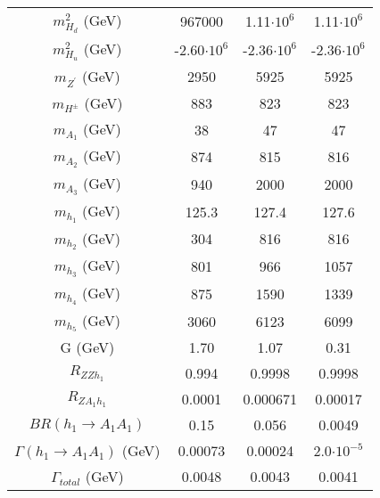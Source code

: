 \documentclass[12pt,a4paper]{article}
\begin{document}
\begin{table}
\begin{tabular}{| c || c | c | c |}
$m_{H_d}^2$ (GeV)                  &    967000            & 	1.11$\cdot 10^6$             & 	1.11$\cdot 10^6$                               \\
$m_{H_u}^2$ (GeV)                  &   -2.60$\cdot 10^6$         & 	-2.36$\cdot 10^6$            & 	-2.36$\cdot 10^6$                              \\
$m_{Z^\prime}$ (GeV)                 &    2950              & 	5925                    & 	5925                                      \\
$m_{H^\pm}$ (GeV)                   &    883               & 	823                    & 	823                                      \\
$m_{A_1}$ (GeV)                    &	38                & 	47                    & 	47                                    \\
$m_{A_2}$ (GeV)                    &	874               & 	815                   & 	816                                   \\
$m_{A_3}$ (GeV)                    &	940               & 	2000                   & 	2000                                  \\
$m_{h_1}$ (GeV)                    &	125.3             & 	127.4                 & 	127.6                                  \\
$m_{h_2}$ (GeV)                    &	304               & 	816                   & 	816                                    \\
$m_{h_3}$ (GeV)                    &	801               & 	966                   & 	1057                                   \\
$m_{h_4}$ (GeV)                    &	875               & 	1590                  & 	1339                                   \\
$m_{h_5}$ (GeV)                    &	3060              & 	6123                  & 	6099                                   \\
G (GeV)                          & 	1.70             & 	1.07                  & 	0.31                                   \\
$R_{ZZh_1}$                        &     0.994             & 	0.9998                  & 	0.9998                                   \\
$R_{ZA_1h_1}$                       & 	0.0001           & 	0.000671                 & 	0.00017                                \\
$BR(h_1\rightarrow A_1A_1)$       & 	0.15          & 	0.056                   & 	0.0049                                 \\
$\Gamma(h_1\rightarrow A_1A_1)$ (GeV)& 	0.00073           & 	0.00024                & 	2.0$\cdot10^{-5}$                                \\
$\Gamma_{total}$ (GeV)            & 	0.0048             & 	0.0043                   & 	0.0041                                  \\
\hline
\end{tabular}

\end{table}
\end{document}
